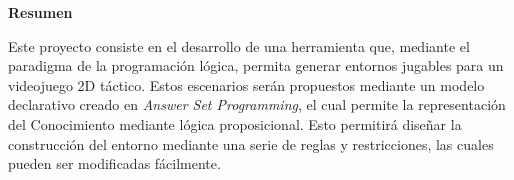 \vspace*{4em}
{\Huge\bfseries{Resumen}\par}
\vspace*{2em}
{Este proyecto consiste en el desarrollo de una herramienta que, mediante el paradigma de la programación lógica, permita generar entornos jugables para un videojuego 2D táctico. Estos escenarios serán propuestos mediante un modelo declarativo creado en \textit{Answer Set Programming}, el cual permite la representación del Conocimiento mediante lógica proposicional. Esto permitirá diseñar la construcción del entorno mediante una serie de reglas y restricciones, las cuales pueden ser modificadas fácilmente.\par}
\vspace*{\fill}